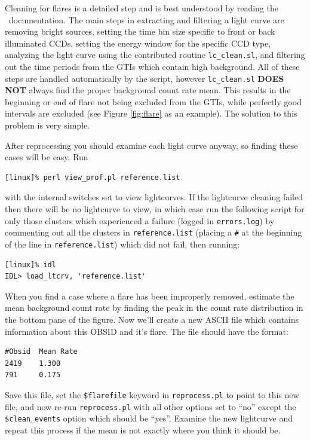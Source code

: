 Cleaning for flares is a detailed step and is best understood by
reading the \ciao\ documentation. The main steps in extracting and
filtering a light curve are removing bright sources, setting the time
bin size specific to front or back illuminated CCDs, setting the
energy window for the specific CCD type, analyzing the light curve
using the contributed routine {\tt{lc\_clean.sl}}, and filtering out
the time periods from the GTIs which contain high background. All of
these steps are handled automatically by the script, however
{\tt{lc\_clean.sl}} {\bf{DOES NOT}} always find the proper background
count rate mean. This results in the beginning or end of flare not
being excluded from the GTIs, while perfectly good intervals are
excluded (see Figure \ref{fig:flare} as an example). The solution to
this problem is very simple.

After reprocessing you should examine each light curve anyway, so
finding these cases will be easy. Run 
\begin{verbatim}
[linux]% perl view_prof.pl reference.list
\end{verbatim}
with the internal switches set to view lightcurves. If the lightcurve
cleaning failed then there will be no lightcurve to view, in which
case run the following script for only those clusters which
experienced a failure (logged in {\tt{errors.log}}) by commenting out
all the clusters in {\tt{reference.list}} (placing a {\tt{\#}} at the
beginning of the line in {\tt{reference.list}}) which did not fail,
then running:
\begin{verbatim}
[linux]% idl
IDL> load_ltcrv, 'reference.list'
\end{verbatim}

When you find a case where a flare has been improperly removed,
estimate the mean background count rate by finding the peak in the
count rate distribution in the bottom pane of the figure. Now we'll
create a new ASCII file which contains information about this OBSID
and it's flare. The file should have the format:
\begin{verbatim}
#Obsid  Mean Rate
2419    1.300
791     0.175
\end{verbatim}
Save this file, set the {\tt{\$flarefile}} keyword in
{\tt{reprocess.pl}} to point to this new file, and now re-run
{\tt{reprocess.pl}} with all other options set to ``no'' except the
{\tt{\$clean\_events}} option which should be ``yes''. Examine the new
lightcurve and repeat this process if the mean is not exactly where
you think it should be.

